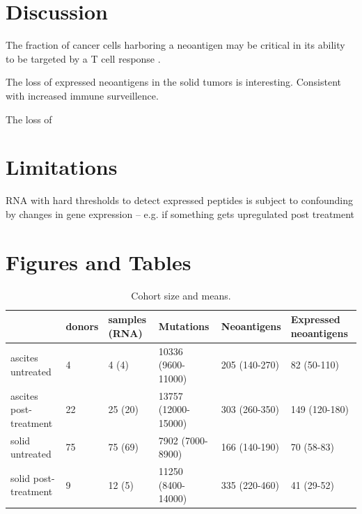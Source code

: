 \section*{Discussion}

The fraction of cancer cells harboring a neoantigen may be critical in its ability to be targeted by a T cell response \cite{McGranahan_2016}.

The loss of expressed neoantigens in the solid tumors is interesting. Consistent with increased immune surveillence.

The loss of 

\section*{Limitations}
RNA with hard thresholds to detect expressed peptides is subject to confounding by changes in gene expression -- e.g. if something gets upregulated post treatment

\section*{Figures and Tables}

\begin{table}
\begin{tabular}{llllll}
\toprule
{} & donors & samples (RNA) &            Mutations &    Neoantigens & Expressed neoantigens \\
\midrule
ascites untreated      &      4 &         4 (4) &   10336 (9600-11000) &  205 (140-270) &           82 (50-110) \\
ascites post-treatment &     22 &       25 (20) &  13757 (12000-15000) &  303 (260-350) &         149 (120-180) \\
solid untreated        &     75 &       75 (69) &     7902 (7000-8900) &  166 (140-190) &            70 (58-83) \\
solid post-treatment   &      9 &        12 (5) &   11250 (8400-14000) &  335 (220-460) &            41 (29-52) \\
\bottomrule
\end{tabular}

\caption{Cohort size and means.}
\label{tab:cohort}
\end{table}

